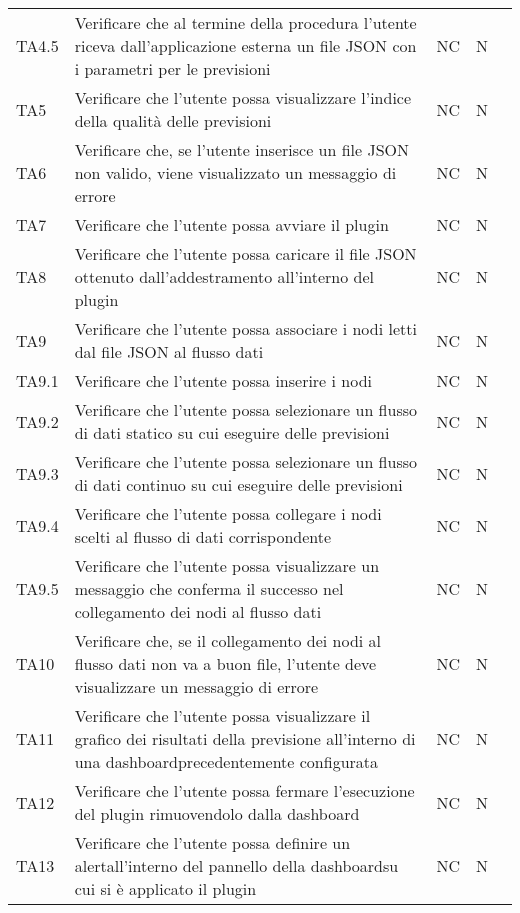 \begin{longtable} {
		>{\centering}p{15mm} 
		>{\centering}p{79.5mm}
		>{\centering}p{10mm} 
		>{\centering}p{10mm}
		>{}p{0mm}}
	TA4.5 & Verificare che al termine della procedura l'utente riceva dall'applicazione esterna un file JSON con i parametri per le previsioni & NC & N  &\TBstrut \\ [2mm]
	TA5 & Verificare che l'utente possa visualizzare l'indice della qualità delle previsioni & NC & N  &\TBstrut \\ [2mm]
	TA6 & Verificare che, se l'utente inserisce un file JSON non valido, viene visualizzato un messaggio di errore & NC & N  &\TBstrut \\ [2mm]
	TA7 & Verificare che l'utente possa avviare il plugin & NC & N  &\TBstrut \\ [2mm]
	TA8 & Verificare che l'utente possa caricare il file JSON ottenuto dall'addestramento all'interno del plugin & NC & N  &\TBstrut \\ [2mm]
	TA9 & Verificare che l'utente possa associare i nodi letti dal file JSON al flusso dati & NC & N  &\TBstrut \\ [2mm]
	TA9.1 & Verificare che l'utente possa inserire i nodi & NC & N  &\TBstrut \\ [2mm]
	TA9.2 & Verificare che l'utente possa selezionare un flusso di dati statico su cui eseguire delle previsioni & NC & N  &\TBstrut \\ [2mm]
	TA9.3 & Verificare che l'utente possa selezionare un flusso di dati continuo su cui eseguire delle previsioni & NC & N  &\TBstrut \\ [2mm]
	TA9.4 & Verificare che l'utente possa collegare i nodi scelti al flusso di dati corrispondente & NC & N  &\TBstrut \\ [2mm]
	TA9.5 & Verificare che l'utente possa visualizzare un messaggio che conferma il successo nel collegamento dei nodi al flusso dati & NC & N  &\TBstrut \\ [2mm]
	TA10 & Verificare che, se il collegamento dei nodi al flusso dati non va a buon file, l'utente deve visualizzare un messaggio di errore & NC & N  &\TBstrut \\ [2mm]
	TA11 & Verificare che l'utente possa visualizzare il grafico dei risultati della previsione all'interno di una dashboard\glosp precedentemente configurata & NC & N  &\TBstrut \\ [2mm]
	TA12 & Verificare che l'utente possa fermare l'esecuzione del plugin rimuovendolo dalla dashboard\glo & NC & N  &\TBstrut \\ [2mm]
	TA13 & Verificare che l'utente possa definire un alert\glosp all'interno del pannello della dashboard\glosp su cui si è applicato il plugin & NC & N  &\TBstrut \\ [2mm]

\end{longtable}
